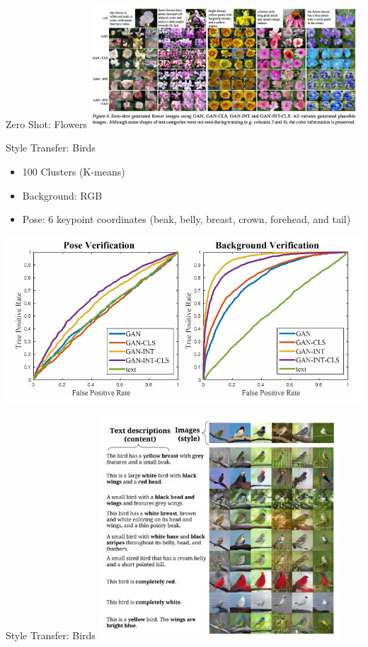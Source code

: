 \documentclass{beamer}
\begin{document}
\begin{frame}{Zero Shot: Flowers}
\centering
\includegraphics[width=10cm]{img/reed/zero_shot_flowers.png}
\end{frame}


\begin{frame}{Style Transfer: Birds}
\begin{itemize}
\item 100 Clusters (K-means)
\item Background: RGB
\item Pose: 6 keypoint coordinates (beak, belly, breast, crown, forehead, and tail)
\end{itemize}

\centering
\includegraphics[width=1.0\linewidth]{img/reed/style_roc.png}
\end{frame}


\begin{frame}{Style Transfer: Birds}
\centering
\includegraphics[width=9cm]{img/reed/style_examples.png}
\end{frame}
\end{document}
